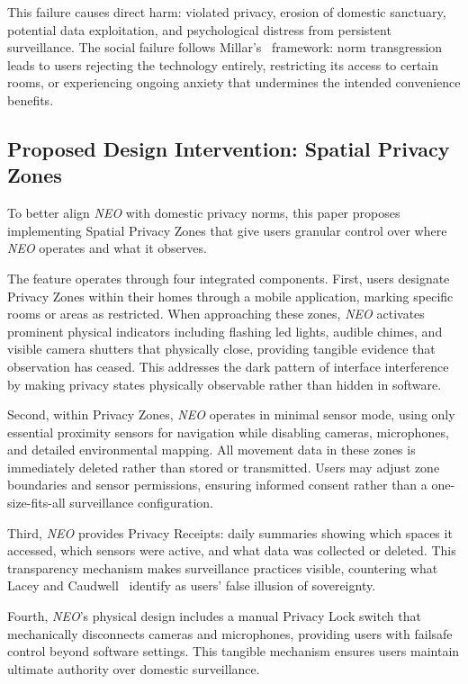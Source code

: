 \documentclass{ieee-portfolio}
\newcommand{\neo}{\textit{NEO}}
\begin{document}
This failure causes direct harm: violated privacy, erosion of domestic sanctuary, potential data exploitation, and psychological distress from persistent surveillance. The social failure follows Millar's~\cite{millar_social_2020} framework: norm transgression leads to users rejecting the technology entirely, restricting its access to certain rooms, or experiencing ongoing anxiety that undermines the intended convenience benefits.

\subsection{Proposed Design Intervention: Spatial Privacy Zones}

To better align \neo{} with domestic privacy norms, this paper proposes implementing Spatial Privacy Zones that give users granular control over where \neo{} operates and what it observes.

The feature operates through four integrated components. First, users designate Privacy Zones within their homes through a mobile application, marking specific rooms or areas as restricted. When approaching these zones, \neo{} activates prominent physical indicators including flashing \gls{led} lights, audible chimes, and visible camera shutters that physically close, providing tangible evidence that observation has ceased. This addresses the dark pattern of interface interference~\cite{gray_dark_2018} by making privacy states physically observable rather than hidden in software.

Second, within Privacy Zones, \neo{} operates in minimal sensor mode, using only essential proximity sensors for navigation while disabling cameras, microphones, and detailed environmental mapping. All movement data in these zones is immediately deleted rather than stored or transmitted. Users may adjust zone boundaries and sensor permissions, ensuring informed consent rather than a one-size-fits-all surveillance configuration.

Third, \neo{} provides Privacy Receipts: daily summaries showing which spaces it accessed, which sensors were active, and what data was collected or deleted. This transparency mechanism makes surveillance practices visible, countering what Lacey and Caudwell~\cite{lacey_cuteness_2019} identify as users' false illusion of sovereignty.

Fourth, \neo{}'s physical design includes a manual Privacy Lock switch that mechanically disconnects cameras and microphones, providing users with failsafe control beyond software settings. This tangible mechanism ensures users maintain ultimate authority over domestic surveillance.
\end{document}
